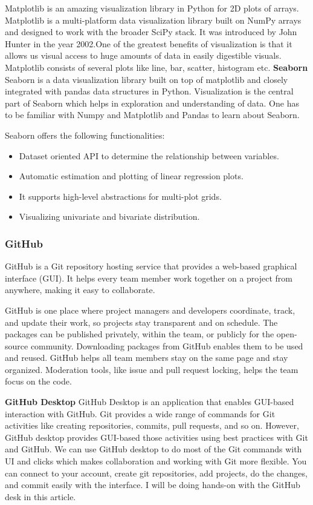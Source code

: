 \documentclass[12pt]{article}
\begin{document}
Matplotlib is an amazing visualization library in Python for 2D plots of arrays. Matplotlib is a multi-platform data visualization library built on NumPy arrays and designed to work with the broader SciPy stack. It was introduced by John Hunter in the year 2002.One of the greatest benefits of visualization is that it allows us visual access to huge amounts of data in easily digestible visuals. Matplotlib consists of several plots like line, bar, scatter, histogram etc.
\textbf{Seaborn}
\\
Seaborn is a data visualization library built on top of matplotlib and closely integrated with pandas data structures in Python. Visualization is the central part of Seaborn which helps in exploration and understanding of data. One has to be familiar with Numpy and Matplotlib and Pandas to learn about Seaborn.

Seaborn offers the following functionalities:
\begin{itemize}
\item Dataset oriented API to determine the relationship between variables.
\item Automatic estimation and plotting of linear regression plots.
\item It supports high-level abstractions for multi-plot grids.
\item Visualizing univariate and bivariate distribution.
\end{itemize}

\newpage
\subsubsection{GitHub}
GitHub is a Git repository hosting service that provides a web-based graphical interface (GUI). It helps every team member work together on a project from anywhere, making it easy to collaborate. 

GitHub is one place where project managers and developers coordinate, track, and update their work, so projects stay transparent and on schedule. The packages can be published privately, within the team, or publicly for the open-source community. Downloading packages from GitHub enables them to be used and reused. GitHub helps all team members stay on the same page and stay organized. Moderation tools, like issue and pull request locking, helps the team focus on the code.

\textbf{GitHub Desktop}
GitHub Desktop is an application that enables GUI-based interaction with GitHub. Git provides a wide range of commands for Git activities like creating repositories, commits, pull requests, and so on. However, GitHub desktop provides GUI-based those activities using best practices with Git and GitHub. We can use GitHub desktop to do most of the Git commands with UI and clicks which makes collaboration and working with Git more flexible. You can connect to your account, create git repositories, add projects, do the changes, and commit easily with the interface. I will be doing hands-on with the GitHub desk in this article.
\end{document}
